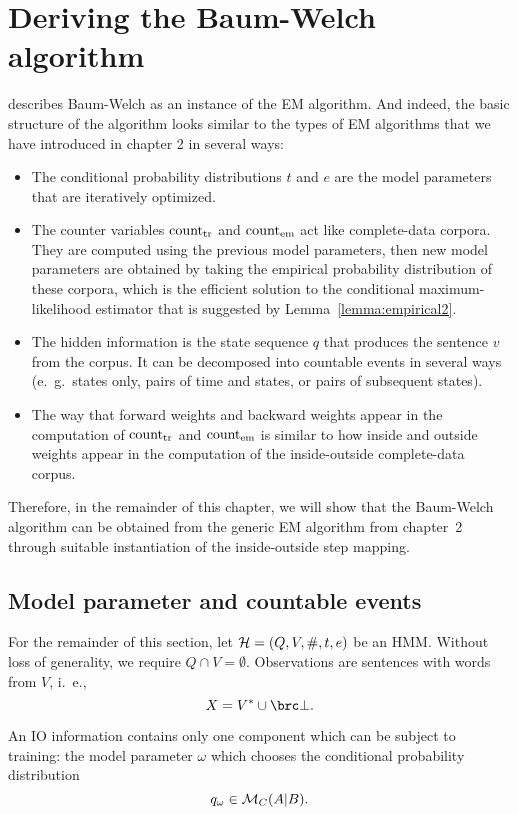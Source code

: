 \section{Deriving the Baum-Welch algorithm}\label{sect:03-deriving}

\cite{jm09} describes Baum-Welch as an instance of the EM algorithm. And
indeed, the basic structure of the algorithm looks similar to the types of EM
algorithms that we have introduced in chapter 2 in several ways:
\begin{itemize}
 \item The conditional probability distributions $t$ and $e$ are the model
  parameters that are iteratively optimized.
 \item The counter variables $\operatorname{count}_\mathrm{tr}$ and $\operatorname{count}_\mathrm{em}$ act like
  complete-data corpora. They are computed using the previous model parameters,
  then new model parameters are obtained by taking the empirical probability
  distribution of these corpora, which is the efficient solution to the
  conditional maximum-likelihood estimator that is suggested by
  Lemma~\ref{lemma:empirical2}.
 \item The hidden information is the state sequence $q$ that produces the
  sentence $v$ from the corpus. It can be decomposed into countable events in
  several ways (e.~g.~states only, pairs of time and states, or pairs of
  subsequent states).
 \item The way that forward weights and backward weights appear in the
  computation of $\operatorname{count}_\mathrm{tr}$ and $\operatorname{count}_\mathrm{em}$ is similar to how
  inside and outside weights appear in the computation of the inside-outside
  complete-data corpus.
\end{itemize}

Therefore, in the remainder of this chapter, we will show that the Baum-Welch
algorithm can be obtained from the generic EM algorithm from chapter~2 through
suitable instantiation of the inside-outside step mapping.

\subsection{Model parameter and countable events}

For the remainder of this section, let $\mathcal H = (Q,V,\#,t,e)$ be an HMM. Without
loss of generality, we require $Q\cap V=\emptyset$. Observations are sentences
with words from $V$, i.~e.,
\[
 X = V^* \cup\brc\bot. \label{eq:03-X}
\]

An IO information contains only one component which can be subject to training:
the model parameter $\omega$ which chooses the conditional probability
distribution
\[
 q_\omega \in \mathcal M_C(A|B).
\]

